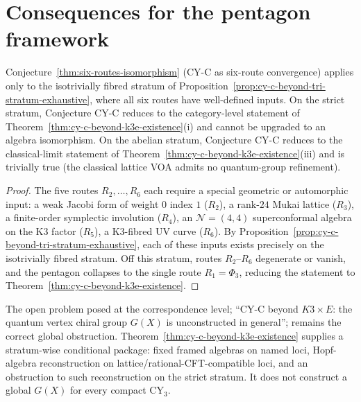 \section{Consequences for the pentagon framework}
\label{sec:cy-c-beyond-pentagon-consequences}

\begin{corollary}
\label{cor:cy-c-beyond-pentagon-scope}
Conjecture~\ref{thm:six-routes-isomorphism} (CY-C as six-route convergence) applies only
to the isotrivially fibred stratum of
Proposition~\ref{prop:cy-c-beyond-tri-stratum-exhaustive}, where all six routes have
well-defined inputs. On the strict stratum, Conjecture CY-C reduces to the
category-level statement of
Theorem~\ref{thm:cy-c-beyond-k3e-existence}\textup{(i)} and cannot be upgraded to an
algebra isomorphism. On the abelian stratum, Conjecture CY-C reduces to the
classical-limit statement of
Theorem~\ref{thm:cy-c-beyond-k3e-existence}\textup{(iii)} and is trivially true
(the classical lattice VOA admits no quantum-group refinement).
\end{corollary}

\begin{proof}
The five routes $R_2, \ldots, R_6$ each require a special geometric or automorphic input:
a weak Jacobi form of weight $0$ index $1$ ($R_2$), a rank-$24$ Mukai lattice ($R_3$),
a finite-order symplectic involution ($R_4$), an $\mathcal{N} = (4,4)$ superconformal
algebra on the K3 factor ($R_5$), a K3-fibred UV curve ($R_6$). By
Proposition~\ref{prop:cy-c-beyond-tri-stratum-exhaustive}, each of these inputs exists
precisely on the isotrivially fibred stratum. Off this stratum,
routes $R_2$--$R_6$ degenerate or vanish, and the pentagon collapses to the single route
$R_1 = \Phi_3$, reducing the statement to
Theorem~\ref{thm:cy-c-beyond-k3e-existence}.
\end{proof}

\begin{remark}
\label{rem:cy-c-beyond-op3}
The open problem posed at the correspondence level; ``CY-C beyond $K3 \times E$: the
quantum vertex chiral group $G(X)$ is unconstructed in general''; remains the correct
global obstruction. Theorem~\ref{thm:cy-c-beyond-k3e-existence} supplies a stratum-wise
conditional package: fixed framed algebras on named loci, Hopf-algebra reconstruction on
lattice/rational-CFT-compatible loci, and an obstruction to such reconstruction on the
strict stratum. It does not construct a global $G(X)$ for every compact CY$_3$.
\end{remark}

